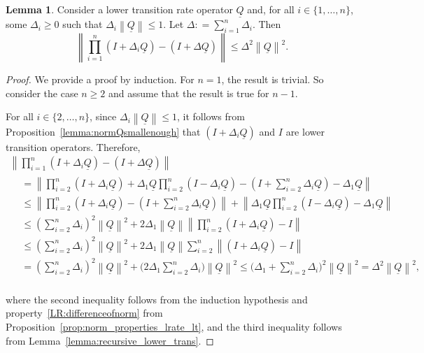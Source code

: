 \documentclass[10pt,a4paper]{paper}
\theoremstyle{definition}
\newtheorem{lemma}[theorem]{Lemma}
\newcommand{\lrate}{\underline{Q}}
\newcommand{\norm}[1]{\left\lVert #1 \right\rVert}
\newcommand{\coloneqq}{:\!=}
\begin{document}
\begin{lemma}\label{lemma:justthelinearpart}
Consider a lower transition rate operator $\lrate$ and, for all $i\in\{1,\ldots,n\}$, some $\Delta_i\geq0$ such that $\Delta_i\norm{\lrate}\leq1$. Let $\Delta\coloneqq\sum_{i=1}^n\Delta_i$. Then
\begin{equation*}
\norm{\prod_{i=1}^n(I+\Delta_i\lrate)-(I+\Delta\lrate)}\leq\Delta^2\norm{\lrate}^2.
\end{equation*}
\end{lemma}
\begin{proof}
We provide a proof by induction. For $n=1$, the result is trivial. So consider the case $n\geq2$ and assume that the result is true for $n-1$. 

For all $i\in\{2,\dots,n\}$, since $\Delta_i\norm{\lrate}\leq1$, it follows from Proposition~\ref{lemma:normQsmallenough} that $(I+\Delta_i\lrate)$ and $I$ are lower transition operators. Therefore,
\begin{multline*}
\norm{\prod_{i=1}^n(I+\Delta_i\lrate)-(I+\Delta\lrate)}\\
\begin{aligned}
&=\norm{\prod_{i=2}^n(I+\Delta_i\lrate)+\Delta_1\lrate\prod_{i=2}^n(I-\Delta_i\lrate)-(I+\sum_{i=2}^n\Delta_i\lrate)-\Delta_1\lrate}\\
&\leq\norm{\prod_{i=2}^n(I+\Delta_i\lrate)-(I+\sum_{i=2}^n\Delta_i\lrate)}+\norm{\Delta_1\lrate\prod_{i=2}^n(I-\Delta_i\lrate)-\Delta_1\lrate}\\
&\leq(\sum_{i=2}^n\Delta_i)^2\norm{\lrate}^2
+2\Delta_1\norm{\lrate}
\norm{\prod_{i=2}^n(I+\Delta_i\lrate)-I}\\
&\leq(\sum_{i=2}^n\Delta_i)^2\norm{\lrate}^2
+2\Delta_1\norm{\lrate}
\sum_{i=2}^n
\norm{(I+\Delta_i\lrate)-I}\\
&=(\sum_{i=2}^n\Delta_i)^2\norm{\lrate}^2
+\Big(2\Delta_1
\sum_{i=2}^n
\Delta_i\Big)\norm{\lrate}^2
\leq\Big(
\Delta_1+\sum_{i=2}^n\Delta_i
\Big)^2\norm{\lrate}^2
=\Delta^2\norm{\lrate}^2,
\end{aligned}
\end{multline*}\\[3pt]
where the second inequality follows from the induction hypothesis and property~\ref{LR:differenceofnorm} from Proposition~\ref{prop:norm_properties_lrate_lt}, and the third inequality follows from Lemma~\ref{lemma:recursive_lower_trans}.
\end{proof}
\end{document}
